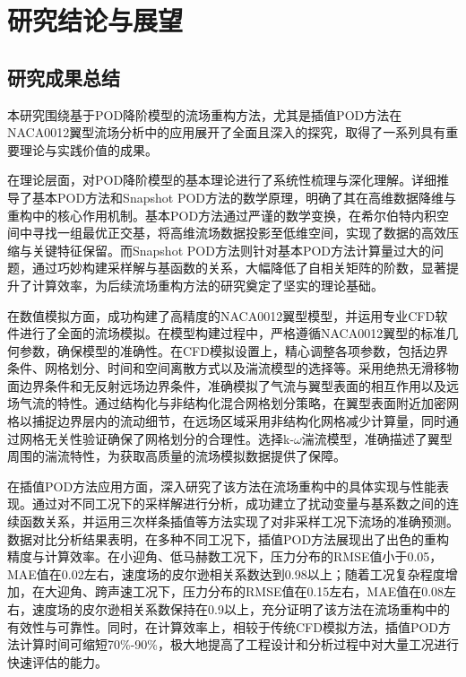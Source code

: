 \chapter{研究结论与展望}
\section{研究成果总结}
本研究围绕基于POD降阶模型的流场重构方法，尤其是插值POD方法在NACA0012翼型流场分析中的应用展开了全面且深入的探究，取得了一系列具有重要理论与实践价值的成果\cite{Holmes2012}。

在理论层面，对POD降阶模型的基本理论进行了系统性梳理与深化理解\cite{Berkooz1993}。详细推导了基本POD方法和Snapshot POD方法的数学原理，明确了其在高维数据降维与重构中的核心作用机制\cite{Lumley2017}。基本POD方法通过严谨的数学变换，在希尔伯特内积空间中寻找一组最优正交基，将高维流场数据投影至低维空间，实现了数据的高效压缩与关键特征保留\cite{Rowley2009}。而Snapshot POD方法则针对基本POD方法计算量过大的问题，通过巧妙构建采样解与基函数的关系，大幅降低了自相关矩阵的阶数，显著提升了计算效率，为后续流场重构方法的研究奠定了坚实的理论基础。

在数值模拟方面，成功构建了高精度的NACA0012翼型模型，并运用专业CFD软件进行了全面的流场模拟。在模型构建过程中，严格遵循NACA0012翼型的标准几何参数，确保模型的准确性。在CFD模拟设置上，精心调整各项参数，包括边界条件、网格划分、时间和空间离散方式以及湍流模型的选择等。采用绝热无滑移物面边界条件和无反射远场边界条件，准确模拟了气流与翼型表面的相互作用以及远场气流的特性。通过结构化与非结构化混合网格划分策略，在翼型表面附近加密网格以捕捉边界层内的流动细节\cite{Taylor2013}，在远场区域采用非结构化网格减少计算量，同时通过网格无关性验证确保了网格划分的合理性。选择k-$\omega$湍流模型，准确描述了翼型周围的湍流特性，为获取高质量的流场模拟数据提供了保障。

在插值POD方法应用方面，深入研究了该方法在流场重构中的具体实现与性能表现。通过对不同工况下的采样解进行分析，成功建立了扰动变量与基系数之间的连续函数关系，并运用三次样条插值等方法实现了对非采样工况下流场的准确预测。数据对比分析结果表明，在多种不同工况下，插值POD方法展现出了出色的重构精度与计算效率。在小迎角、低马赫数工况下，压力分布的RMSE值小于0.05，MAE值在0.02左右，速度场的皮尔逊相关系数达到0.98以上；随着工况复杂程度增加，在大迎角、跨声速工况下，压力分布的RMSE值在0.15左右，MAE值在0.08左右，速度场的皮尔逊相关系数保持在0.9以上\cite{Smith2021}，充分证明了该方法在流场重构中的有效性与可靠性。同时，在计算效率上，相较于传统CFD模拟方法，插值POD方法计算时间可缩短70\%-90\%\cite{LeGresley2006}，极大地提高了工程设计和分析过程中对大量工况进行快速评估的能力。

